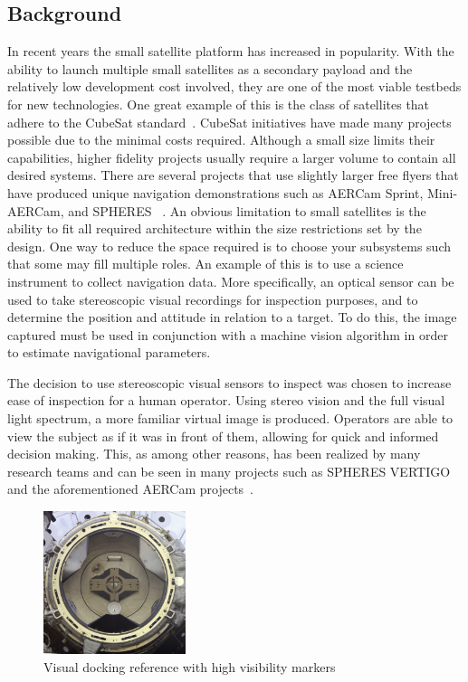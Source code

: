 \documentclass[journal, 10pt]{IEEEtran}
\begin{document}
\subsection{Background}
In recent years the small satellite platform has increased in popularity. With the ability to launch multiple small satellites as a secondary payload and the relatively low development cost involved, they are one of the most viable testbeds for new technologies.  One great example of this is the class of satellites that adhere to the CubeSat standard~\cite{CubeSat}.   CubeSat initiatives have made many projects possible due to the minimal costs required.  Although a small size limits their capabilities, higher fidelity projects usually require a larger volume to contain all desired systems.  There are several projects that use slightly larger free flyers that have produced unique navigation demonstrations such as AERCam Sprint, Mini-AERCam, and SPHERES ~\cite{Aercam, MiniAercam, SPHERES}. An obvious limitation to small satellites is the ability to fit all required architecture within the size restrictions set by the design.  One way to reduce the space required is to choose your subsystems such that some may fill multiple roles.  An example of this is to use a science instrument to collect navigation data.  More specifically, an optical sensor can be used to take stereoscopic visual recordings for inspection purposes, and to determine the position and attitude in relation to a target.  To do this, the image captured must be used in conjunction with a machine vision algorithm in order to estimate navigational parameters.

The decision to use stereoscopic visual sensors to inspect was chosen to increase ease of inspection for a human operator.  Using stereo vision and the full visual light spectrum, a more familiar virtual image is produced.  Operators are able to view the subject as if it was in front of them, allowing for quick and informed decision making.  This, as among other reasons, has been realized by many research teams and can be seen in many projects such as SPHERES VERTIGO and the aforementioned AERCam projects~\cite{Aercam,MiniAercam, Vertigo1}.
\begin{figure}[tb]
\begin{center}
\includegraphics[width=0.37\textwidth]{figures/Docking}
\caption{Visual docking reference with high visibility markers}
\label{VisualDock}
\end{center}
\end{figure}
\end{document}
